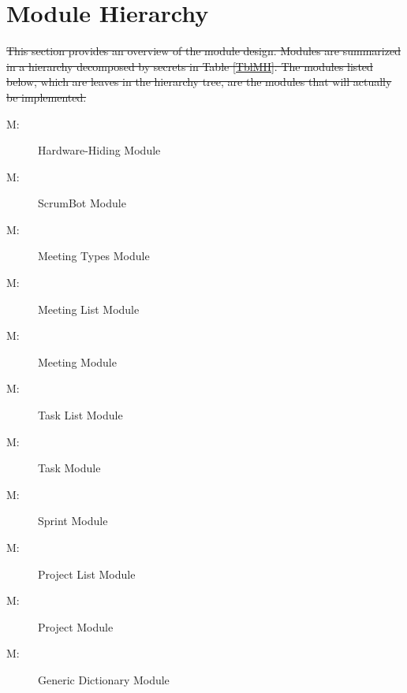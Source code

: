 \documentclass[12pt, titlepage]{article}
\newcounter{mnum}
\newcommand{\mthemnum}{M\themnum}
\begin{document}
\section{Module Hierarchy} \label{SecMH}
\sout{This section provides an overview of the module design. Modules are summarized in a hierarchy decomposed by secrets in Table \ref{TblMH}. The modules listed below, which are leaves in the hierarchy tree, are the modules that will actually be implemented.}

\begin{description}
    \item [ \mthemnum \label{m1}:] Hardware-Hiding Module
    \item [ \mthemnum \label{m2}:] ScrumBot Module
    \item [ \mthemnum \label{m3}:] Meeting Types Module
    \item [ \mthemnum \label{m4}:] Meeting List Module
    \item [ \mthemnum \label{m5}:] Meeting Module
    \item [ \mthemnum \label{m6}:] Task List Module
    \item [ \mthemnum \label{m7}:] Task Module
    \item [ \mthemnum \label{m8}:] Sprint Module
    \item [ \mthemnum \label{m9}:] Project List Module
    \item [ \mthemnum \label{m10}:] Project Module
    \item [ \mthemnum \label{m11}:] Generic Dictionary Module
\end{description}
\end{document}
